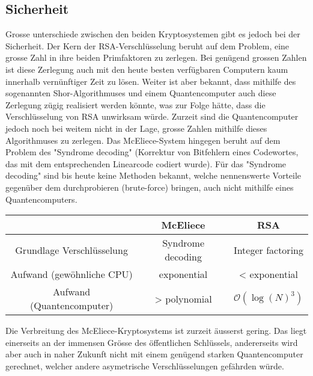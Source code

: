 \subsection{Sicherheit}
Grosse unterschiede zwischen den beiden Kryptosystemen gibt es jedoch bei der Sicherheit.
Der Kern der RSA-Verschlüsselung beruht auf dem Problem, eine grosse Zahl in ihre beiden Primfaktoren zu zerlegen.
Bei genügend grossen Zahlen ist diese Zerlegung auch mit den heute besten verfügbaren Computern kaum innerhalb vernünftiger Zeit zu lösen.
Weiter ist aber bekannt,
dass mithilfe des sogenannten Shor-Algorithmuses \cite{mceliece:shor} und einem Quantencomputer auch diese Zerlegung zügig realisiert werden könnte,
was zur Folge hätte, dass die Verschlüsselung von RSA unwirksam würde.
Zurzeit sind die Quantencomputer jedoch noch bei weitem nicht in der Lage, grosse Zahlen mithilfe dieses Algorithmuses zu zerlegen.
Das McEliece-System hingegen beruht auf dem Problem des "Syndrome decoding" (Korrektur von Bitfehlern eines Codewortes, das mit dem entsprechenden Linearcode codiert wurde).
Für das "Syndrome decoding" sind bis heute keine Methoden bekannt,
welche nennenswerte Vorteile gegenüber dem durchprobieren (brute-force) bringen,
auch nicht mithilfe eines Quantencomputers.
\begin{center}
\begin{tabular}{c|c|c}
                              &McEliece          &RSA              \\
\hline
    Grundlage Verschlüsselung &Syndrome decoding &Integer factoring\\
    Aufwand (gewöhnliche CPU) &exponential       &< exponential    \\
    Aufwand (Quantencomputer) &> polynomial      &$\mathcal{O}(\log(N)^3)$
\end{tabular}
\end{center}
Die Verbreitung des McEliece-Kryptosystems ist zurzeit äusserst gering.
Das liegt einerseits an der immensen Grösse des öffentlichen Schlüssels,
andererseits wird aber auch in naher Zukunft nicht mit einem genügend starken Quantencomputer gerechnet,
welcher andere asymetrische Verschlüsselungen gefährden würde.
